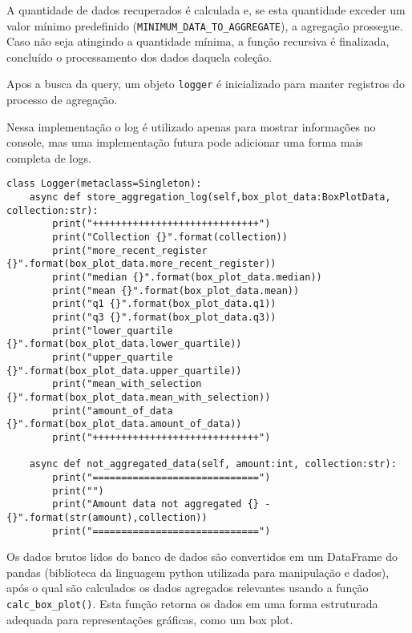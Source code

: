 A quantidade de dados recuperados é calculada e, se esta quantidade exceder um valor mínimo predefinido (\texttt{MINIMUM\_DATA\_TO\_AGGREGATE}), a agregação prossegue. Caso não seja atingindo a quantidade mínima, a função recursiva é finalizada, concluído o processamento dos dados daquela coleção.

Apos a busca da query, um objeto \texttt{logger} é inicializado para manter registros do processo de agregação.

Nessa implementação o log é utilizado apenas para mostrar informações no console, mas uma implementação futura pode adicionar uma forma mais completa de logs.

\begin{verbatim}
class Logger(metaclass=Singleton):
    async def store_aggregation_log(self,box_plot_data:BoxPlotData, collection:str):
        print("+++++++++++++++++++++++++++++")
        print("Collection {}".format(collection))
        print("more_recent_register {}".format(box_plot_data.more_recent_register))
        print("median {}".format(box_plot_data.median))
        print("mean {}".format(box_plot_data.mean))
        print("q1 {}".format(box_plot_data.q1))
        print("q3 {}".format(box_plot_data.q3))
        print("lower_quartile {}".format(box_plot_data.lower_quartile))
        print("upper_quartile {}".format(box_plot_data.upper_quartile))
        print("mean_with_selection {}".format(box_plot_data.mean_with_selection))
        print("amount_of_data {}".format(box_plot_data.amount_of_data))
        print("+++++++++++++++++++++++++++++")

    async def not_aggregated_data(self, amount:int, collection:str):
        print("=============================")
        print("")
        print("Amount data not aggregated {} - {}".format(str(amount),collection))
        print("=============================")
\end{verbatim}

Os dados brutos lidos do banco de dados são convertidos em um DataFrame do pandas (biblioteca da linguagem python utilizada para manipulação e dados), após o qual são calculados os dados agregados relevantes usando a função \texttt{calc\_box\_plot()}. Esta função retorna os dados em uma forma estruturada adequada para representações gráficas, como um box plot.

